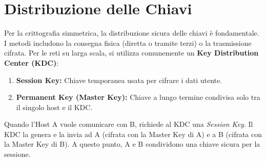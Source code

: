 \section{Distribuzione delle Chiavi}

Per la crittografia simmetrica, la distribuzione sicura delle chiavi è fondamentale. I metodi includono la consegna fisica (diretta o tramite terzi) o la trasmissione cifrata. Per le reti su larga scala, si utilizza comunemente un \textbf{Key Distribution Center (KDC)}:

\begin{enumerate}
    \item \textbf{Session Key:} Chiave temporanea usata per cifrare i dati utente.
    \item \textbf{Permanent Key (Master Key):} Chiave a lungo termine condivisa solo tra il singolo host e il KDC.
\end{enumerate}

Quando l'Host A vuole comunicare con B, richiede al KDC una \textit{Session Key}. Il KDC la genera e la invia ad A (cifrata con la Master Key di A) e a B (cifrata con la Master Key di B). A questo punto, A e B condividono una chiave sicura per la sessione.